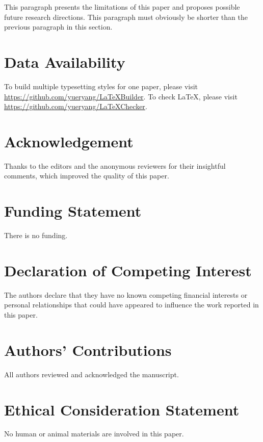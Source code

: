 \documentclass[conference,compsoc]{IEEEtran}
\begin{document}
This paragraph presents the limitations of this paper and proposes possible future research directions. This paragraph must obviously be shorter than the previous paragraph in this section. 

\section*{Data Availability}

To build multiple typesetting styles for one paper, please visit \url{https://github.com/yueryang/LaTeXBuilder}. To check LaTeX, please visit \url{https://github.com/yueryang/LaTeXChecker}. 

\section*{Acknowledgement}

Thanks to the editors and the anonymous reviewers for their insightful comments, which improved the quality of this paper. 

\section*{Funding Statement}

There is no funding. 

\section*{Declaration of Competing Interest}

The authors declare that they have no known competing financial interests or personal relationships that could have appeared to influence the work reported in this paper. 

\section*{Authors' Contributions}

All authors reviewed and acknowledged the manuscript. 

\section*{Ethical Consideration Statement}

No human or animal materials are involved in this paper. 



\end{document}
